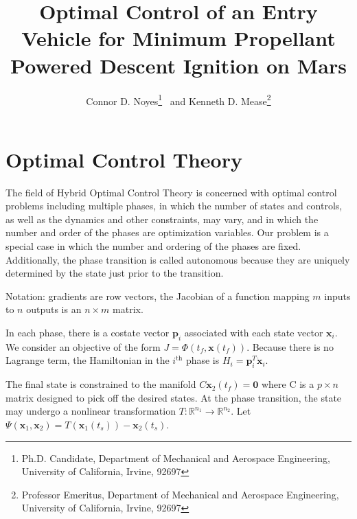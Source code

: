 \documentclass[]{article}
\title{Optimal Control of an Entry Vehicle for Minimum Propellant Powered Descent Ignition on Mars}
\newcommand{\state}{\ensuremath{\mathbf{x}}}
\newcommand{\costate}{\mathbf{p}}
\begin{document}
\author{Connor D. Noyes\thanks{Ph.D. Candidate, Department of Mechanical and Aerospace Engineering, University of California, Irvine, 92697} \ and Kenneth D. Mease\thanks{Professor Emeritus, Department of Mechanical and Aerospace Engineering, University of California, Irvine, 92697}}
\maketitle

\section{Optimal Control Theory}

The field of Hybrid Optimal Control Theory is concerned with optimal control problems including multiple phases, in which the number of states and controls, as well as the dynamics and other constraints, may vary, and in which the number and order of the phases are optimization variables. Our problem is a special case in which the number and ordering of the phases are fixed. Additionally, the phase transition is called autonomous because they are uniquely determined by the state just prior to the transition. 

Notation: gradients are row vectors, the Jacobian of a function mapping $m$ inputs to $n$ outputs is an $n\times m$ matrix.

In each phase, there is a costate vector $\costate_i$ associated with each state vector $\state_i$. We consider an objective of the form $J = \Phi(t_f, \mathbf{x}(t_f))$. Because there is no Lagrange term, the Hamiltonian in the $i^{\mathrm{th}}$  phase is $H_i = \costate_i^T\dot{\mathbf{x}}_i$.

The final state is constrained to the manifold $C\state_2(t_f) = \mathbf{0}$ where C is a $p\times n$ matrix designed to pick off the desired states. At the phase transition, the state may undergo a nonlinear transformation $T: \mathbb{R}^{n_1} \to \mathbb{R}^{n_2}$. Let $\Psi(\state_1,\state_2) = T(\state_1(t_s))-\state_2(t_s)$.
\end{document}
